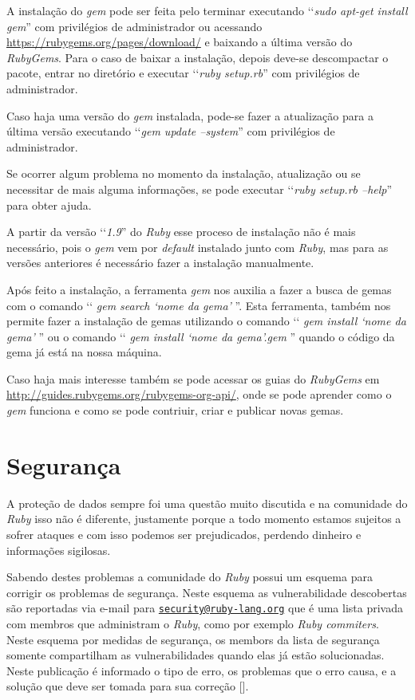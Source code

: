 A instalação do \emph{gem} pode ser feita pelo terminar executando ‘‘\emph{sudo apt-get install gem}'' com
privilégios de administrador ou acessando \url{https://rubygems.org/pages/download/} e baixando a última
versão do \emph{RubyGems}. Para o caso de baixar a instalação, depois deve-se descompactar o pacote, entrar
no diretório e executar ‘‘\emph{ruby setup.rb}'' com privilégios de administrador.

Caso haja uma versão do \emph{gem} instalada, pode-se fazer a atualização para a última versão executando
‘‘\emph{gem update --system}'' com privilégios de administrador.

Se ocorrer algum problema no momento da instalação, atualização ou se necessitar de mais
alguma informações, se pode executar ‘‘\emph{ruby setup.rb --help}'' para obter ajuda.

A partir da versão ‘‘\emph{1.9}'' do \emph{Ruby} esse proceso de instalação não é mais necessário, pois o
\emph{gem} vem por \emph{default} instalado junto com \emph{Ruby}, mas para as versões anteriores
é necessário fazer a instalação manualmente.

Após feito a instalação, a ferramenta \emph{gem} nos auxilia a fazer a busca de gemas com o comando
‘‘ \emph{gem search ‘nome da gema' }''. Esta ferramenta, também nos permite fazer a instalação de
gemas utilizando o comando ‘‘ \emph{gem install ‘nome da gema' }'' ou o comando
‘‘ \emph{gem install ‘nome da gema'.gem }'' quando o código da gema já está na nossa máquina.

Caso haja mais interesse também se pode acessar os guias do \emph{RubyGems} em
\url{http://guides.rubygems.org/rubygems-org-api/}, onde se pode aprender como o \emph{gem} funciona e como
se pode contriuir, criar e publicar novas gemas.

\section{Segurança}
\label{segurança_ruby}

A proteção de dados sempre foi uma questão muito discutida e na comunidade do \emph{Ruby} isso não é
diferente, justamente porque a todo momento estamos sujeitos a sofrer ataques e com isso podemos ser
prejudicados, perdendo dinheiro e informações sigilosas.

Sabendo destes problemas a comunidade do \emph{Ruby} possui um esquema para corrigir os problemas de
segurança. Neste esquema as vulnerabilidade descobertas são reportadas via e-mail para
\href{mailto:security@ruby-lang.org}{\nolinkurl{security@ruby-lang.org}} que é uma lista privada com
membros que administram o \emph{Ruby}, como por exemplo \emph{Ruby commiters}. Neste esquema por medidas
de segurança, os membors da lista de segurança somente compartilham as vulnerabilidades quando elas já
estão solucionadas. Neste publicação é informado o tipo de erro, os problemas que o erro causa, e a
solução que deve ser tomada para
sua correção [].

